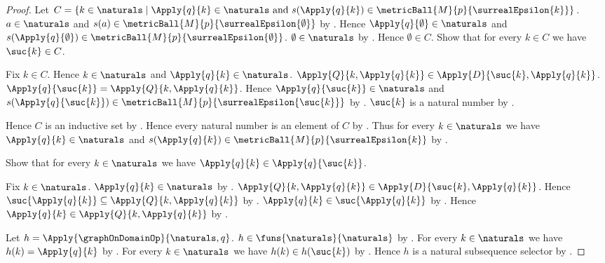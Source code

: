 \begin{proof}
    Let $C=\{k\in\naturals\mid
        \text{$\Apply{q}{k}\in\naturals$ and
        $s(\Apply{q}{k})
            \in\metricBall{M}{p}{\surrealEpsilon{k}}$}\}$.
    $a\in\naturals$ and
        $s(a)\in\metricBall{M}{p}{\surrealEpsilon{\emptyset}}$ by
        \auto.
    Hence $\Apply{q}{\emptyset}\in\naturals$ and
        $s(\Apply{q}{\emptyset})
            \in\metricBall{M}{p}{\surrealEpsilon{\emptyset}}$.
    $\emptyset\in\naturals$ by .
    Hence $\emptyset\in C$.
    Show that for every $k\in C$ we have $\suc{k}\in C$.
    \begin{subproof}
        Fix $k\in C$.
        Hence $k\in\naturals$ and $\Apply{q}{k}\in\naturals$.
        $\Apply{Q}{k,\Apply{q}{k}}
            \in\Apply{D}{\suc{k},\Apply{q}{k}}$.
        $\Apply{q}{\suc{k}}
            =\Apply{Q}{k,\Apply{q}{k}}$.
        Hence $\Apply{q}{\suc{k}}\in\naturals$ and
            $s(\Apply{q}{\suc{k}})
                \in\metricBall{M}{p}{\surrealEpsilon{\suc{k}}}$ by
            \auto.
        $\suc{k}$ is a natural number by .
    \end{subproof}
    Hence $C$ is an inductive set by .
    Hence every natural number is an element of $C$ by
        .
    Thus for every $k\in\naturals$ we have
        $\Apply{q}{k}\in\naturals$ and
        $s(\Apply{q}{k})
            \in\metricBall{M}{p}{\surrealEpsilon{k}}$ by
        \auto.

    Show that for every $k\in\naturals$ we have
        $\Apply{q}{k}\in\Apply{q}{\suc{k}}$.
    \begin{subproof}
        Fix $k\in\naturals$.
        $\Apply{q}{k}\in\naturals$ by \auto.
        $\Apply{Q}{k,\Apply{q}{k}}
            \in\Apply{D}{\suc{k},\Apply{q}{k}}$.
        Hence $\suc{\Apply{q}{k}}
            \subseteq\Apply{Q}{k,\Apply{q}{k}}$ by \auto.
        $\Apply{q}{k}\in\suc{\Apply{q}{k}}$ by
            .
        Hence $\Apply{q}{k}\in\Apply{Q}{k,\Apply{q}{k}}$ by
            .
    \end{subproof}

    Let $h=\Apply{\graphOnDomainOp}{\naturals,q}$.
    $h\in\funs{\naturals}{\naturals}$ by
        .
    For every $k\in\naturals$ we have $h(k)=\Apply{q}{k}$ by
        .
    For every $k\in\naturals$ we have $h(k)\in h(\suc{k})$ by
        \auto.
    Hence $h$ is a natural subsequence selector by
        .


\end{proof}

